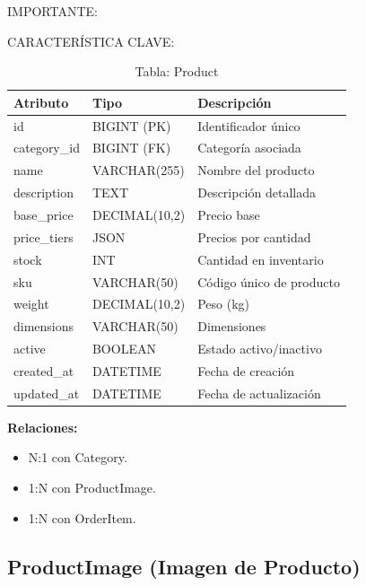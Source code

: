 \documentclass[12pt,a4paper,oneside]{book}
\begin{document}
\begin{alert}{IMPORTANTE:}
\begin{info}{CARACTERÍSTICA CLAVE:}
\begin{table}[ht]
    \centering
    \caption{Tabla: Product}
    \begin{tabular}{@{}lll@{}}
        \toprule
        \textbf{Atributo} & \textbf{Tipo} & \textbf{Descripción} \\
        \midrule
        id & BIGINT (PK) & Identificador único \\
        category\_id & BIGINT (FK) & Categoría asociada \\
        name & VARCHAR(255) & Nombre del producto \\
        description & TEXT & Descripción detallada \\
        base\_price & DECIMAL(10,2) & Precio base \\
        price\_tiers & JSON & Precios por cantidad \\
        stock & INT & Cantidad en inventario \\
        sku & VARCHAR(50) & Código único de producto \\
        weight & DECIMAL(10,2) & Peso (kg) \\
        dimensions & VARCHAR(50) & Dimensiones \\
        active & BOOLEAN & Estado activo/inactivo \\
        created\_at & DATETIME & Fecha de creación \\
        updated\_at & DATETIME & Fecha de actualización \\
        \bottomrule
    \end{tabular}
\end{table}

\textbf{Relaciones:}
\begin{itemize}
    \item N:1 con Category.
    \item 1:N con ProductImage.
    \item 1:N con OrderItem.
\end{itemize}

\subsection{ProductImage (Imagen de Producto)}
\label{sec:productimage}


\end{info}
\end{alert}
\end{document}
